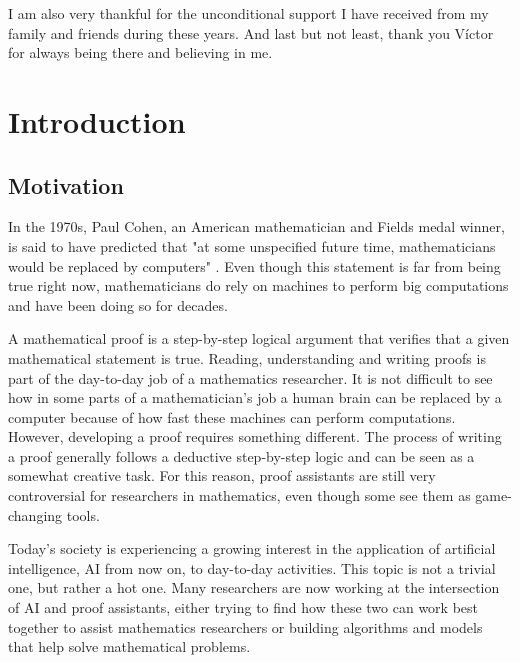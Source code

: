 \documentclass[11pt]{article}
\theoremstyle{definition}
\begin{document}
I am also very thankful for the unconditional support I have received from my family and friends during these years. And last but not least, thank you Víctor for always being there and believing in me.


\newpage

\tableofcontents

\newpage



\section{Introduction} \label{introduction}

\subsection{Motivation}

In the 1970s, Paul Cohen, an American mathematician and Fields medal winner, is said to have predicted that "at some unspecified future time, mathematicians would be replaced by computers" \cite{humanizing}. Even though this statement is far from being true right now, mathematicians do rely on machines to perform big computations and have been doing so for decades.

A mathematical proof is a step-by-step logical argument that verifies that a given mathematical statement is true. Reading, understanding and writing proofs is part of the day-to-day job of a mathematics researcher. It is not difficult to see how in some parts of a mathematician's job a human brain can be replaced by a computer because of how fast these machines can perform computations. However, developing a proof requires something different. The process of writing a proof generally follows a deductive step-by-step logic and can be seen as a somewhat creative task. For this reason, proof assistants are still very controversial for researchers in mathematics, even though some see them as game-changing tools. 

Today's society is experiencing a growing interest in the application of artificial intelligence, AI from now on, to day-to-day activities. This topic is not a trivial one, but rather a hot one. Many researchers are now working at the intersection of AI and proof assistants, either trying to find how these two can work best together to assist mathematics researchers or building algorithms and models that help solve mathematical problems. 
\end{document}
